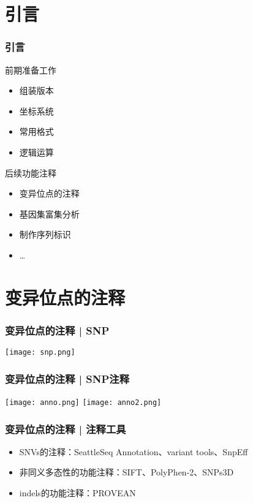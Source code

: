 \section{引言}
\begin{frame}
  \frametitle{引言}
  \begin{block}{前期准备工作}
    \begin{itemize}
      \item 组装版本
      \item 坐标系统
      \item 常用格式
      \item 逻辑运算
    \end{itemize}
  \end{block}
  \pause
  \begin{block}{后续功能注释}
    \begin{itemize}
      \item 变异位点的注释
      \item 基因集富集分析
      \item 制作序列标识
      \item \ldots
    \end{itemize}
  \end{block}
\end{frame}

\section{变异位点的注释}
\begin{frame}
  \frametitle{变异位点的注释 | SNP}
    \begin{center}
      \texttt{[image: snp.png]}
    \end{center}
\end{frame}

\begin{frame}
  \frametitle{变异位点的注释 | \alert{SNP注释}}
    \begin{center}
      \texttt{[image: anno.png]}
      \vspace{0.5cm}
      \texttt{[image: anno2.png]}
    \end{center}
\end{frame}

\begin{frame}
  \frametitle{变异位点的注释 | 注释工具}
  \begin{itemize}
    \item SNVs的注释：SeattleSeq Annotation、variant tools、SnpEff
    \item 非同义多态性的功能注释：SIFT、PolyPhen-2、SNPs3D
    \item indels的功能注释：PROVEAN
  \end{itemize}
\end{frame}

